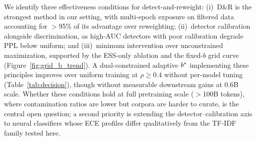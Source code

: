 We identify three effectiveness conditions for detect-and-reweight: (i)~D\&R is the strongest method in our setting, with multi-epoch exposure on filtered data accounting for ${>}$95\% of its advantage over reweighting; (ii)~detector calibration alongside discrimination, as high-AUC detectors with poor calibration degrade PPL below uniform; and (iii)~minimum intervention over unconstrained maximization, supported by the ESS-only ablation and the fixed-$b$ grid curve (Figure~\ref{fig:grid_b_trend}).
A dual-constrained adaptive $b^*$ implementing these principles improves over uniform training at $\rho \geq 0.4$ without per-model tuning (Table~\ref{tab:decision}), though without measurable downstream gains at 0.6B scale.
Whether these conditions hold at full pretraining scale ($>$100B tokens), where contamination ratios are lower but corpora are harder to curate, is the central open question; a second priority is extending the detector--calibration axis to neural classifiers whose ECE profiles differ qualitatively from the TF-IDF family tested here.
